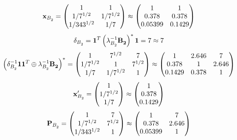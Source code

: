 \documentclass[10pt,a4paper]{article}
\begin{document}
	\[
		\bold{x}_{B_2^{}} = 
		\begin{pmatrix}
			{1}{} & {1}{} \\
			{1} / {{7^ {1 / 2}}} & {1} / {{7^ {1 / 2}}} \\
			{1} / {{343^ {1 / 2}}} & {1} / {{7}} \\
		\end{pmatrix}
		\approx
		\begin{pmatrix}
			1        & 1        \\
			0.378    & 0.378    \\
			0.05399  & 0.1429   \\
		\end{pmatrix}
	\]
	\[
		\delta_{B_2^{}} = \bold{1}^T \left(\lambda_{B_2^{}}^{-1}\bold{B_2^{}}\right)^* \bold{1} = {{7}}{}\approx 7
	\]
	\[
		\left(\delta_{B_2^{}}^{-1}\bold{11}^T \oplus \lambda_{B_2^{}}^{-1}\bold{B_2^{}}\right)^* = 
		\begin{pmatrix}
			{1}{} & {{7^ {1 / 2}}}{} & {{7}}{} \\
			{1} / {{7^ {1 / 2}}} & {1}{} & {{7^ {1 / 2}}}{} \\
			{1} / {{7}} & {1} / {{7^ {1 / 2}}} & {1}{} \\
		\end{pmatrix}
		\approx
		\begin{pmatrix}
			1        & 2.646    & 7        \\
			0.378    & 1        & 2.646    \\
			0.1429   & 0.378    & 1        \\
		\end{pmatrix}
	\]
	\[
		\bold{x}'_{B_2^{}} = 
		\begin{pmatrix}
			{1}{} \\
			{1} / {{7^ {1 / 2}}} \\
			{1} / {{7}} \\
		\end{pmatrix}
		\approx
		\begin{pmatrix}
			1        \\
			0.378    \\
			0.1429   \\
		\end{pmatrix}
	\]
	\[
		\bold{P}_{B_2^{}} = 
		\begin{pmatrix}
			{1}{} & {{7}}{} \\
			{1} / {{7^ {1 / 2}}} & {{7^ {1 / 2}}}{} \\
			{1} / {{343^ {1 / 2}}} & {1}{} \\
		\end{pmatrix}
		\approx
		\begin{pmatrix}
			1        & 7        \\
			0.378    & 2.646    \\
			0.05399  & 1        \\
		\end{pmatrix}
	\]
\end{document}
